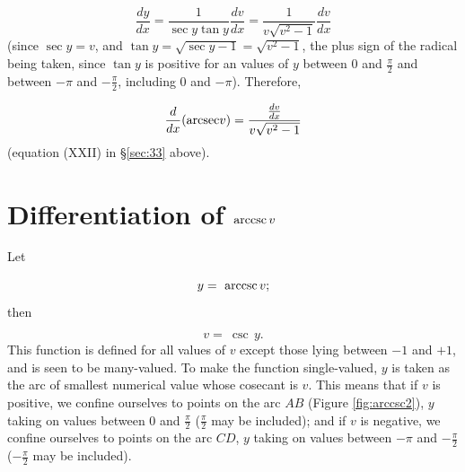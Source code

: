 \[
\frac{dy}{dx} 	= \frac{1}{\sec y \tan y} \frac{dv}{dx}
  	= \frac{1}{v \sqrt{v^2 - 1}} \frac{dv}{dx}
\]
(since $\sec y = v$, and $\tan y = \sqrt{\sec y - 1} = \sqrt{v^2 - 1}$, the plus sign 
of the radical being taken, since $\tan y$ is positive for an values of $y$ between 
$0$ and $\frac{\pi}{2}$ and between $-\pi$ and $-\frac{\pi}{2}$, including 
$0$ and $-\pi$). Therefore,

\[
\frac{d}{dx} ({\rm arcsec} v) 	= \frac{\frac{dv}{dx}}{v \sqrt{v^2 - 1}}
\]
(equation (XXII) in \S \ref{sec:33}  above).

\section{Differentiation of ${\rm arccsc}\, v$}

Let 

\[
y 	=\ {\rm arccsc}\, v; 
\]
then 

\[
v =\ \csc\, y.
\]
This function is defined for all values of $v$ except those lying between $-1$ and $+1$, 
and is seen to be many-valued. To make the function single-valued, $y$ is taken as the 
arc of smallest numerical value whose cosecant is $v$. This means that if $v$ is positive, 
we confine ourselves to points on the arc $AB$ (Figure \ref{fig:arccsc2}), $y$ taking 
on values between $0$ and $\frac{\pi}{2}$ ($\frac{\pi}{2}$ may be included); 
and if $v$ is negative, we confine ourselves to points on the arc $CD$, $y$ taking on 
values between $-\pi$ and $-\frac{\pi}{2}$ ($-\frac{\pi}{2}$ may be included). 

%

